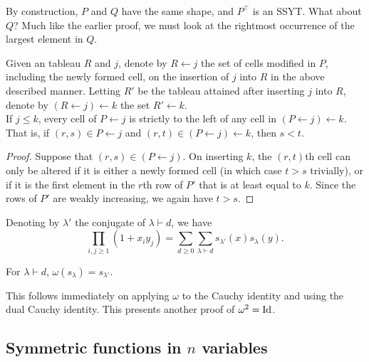 	By construction, $P$ and $Q$ have the same shape, and $P^\top$ is an SSYT. What about $Q$? Much like the earlier proof, we must look at the rightmost occurrence of the largest element in $Q$.

	\begin{flem}
		Given an tableau $R$ and $j$, denote by $R \leftarrow j$ the set of cells modified in $P$, including the newly formed cell, on the insertion of $j$ into $R$ in the above described manner. Letting $R'$ be the tableau attained after inserting $j$ into $R$, denote by $(R \leftarrow j) \leftarrow k$ the set $R' \leftarrow k$.\\
		If $j \le k$, every cell of $P \leftarrow j$ is strictly to the left of any cell in $(P \leftarrow j) \leftarrow k$. That is, if $(r,s) \in P\leftarrow j$ and $(r,t) \in (P \leftarrow j) \leftarrow k$, then $s < t$.
	\end{flem}
	\begin{proof}
		Suppose that $(r,s) \in (P \leftarrow j)$. On inserting $k$, the $(r,t)$th cell can only be altered if it is either a newly formed cell (in which case $t>s$ trivially), or if it is the first element in the $r$th row of $P'$ that is at least equal to $k$. Since the rows of $P'$ are weakly increasing, we again have $t>s$.
	\end{proof}



	\begin{fcor}
		Denoting by $\lambda'$ the conjugate of $\lambda \vdash d$, we have
		\[ \prod_{i,j \ge 1} (1+x_iy_j) = \sum_{d \ge 0} \sum_{\lambda \vdash d} s_{\lambda'}(x) s_\lambda(y). \]
	\end{fcor}

	\begin{fcor}
		For $\lambda \vdash d$, $\omega(s_\lambda) = s_{\lambda'}$.
	\end{fcor}

	This follows immediately on applying $\omega$ to the Cauchy identity and using the dual Cauchy identity. This presents another proof of $\omega^2 = \operatorname{Id}$.


\subsection{Symmetric functions in $n$ variables}

